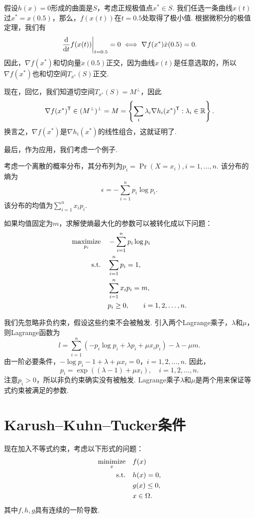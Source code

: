 假设$h(x)=0$形成的曲面是$S$，考虑正规极值点$x^*\in S$. 我们任选一条曲线$x(t)$过$x^*=x(0.5)$，那么，$f(x(t))$在$t=0.5$处取得了极小值. 根据微积分的极值定理，我们有
\[\left.\frac{\mathrm{d}}{\mathrm{d} t}f(x(t))\right|_{t=0.5}=0\iff \nabla f(x^*)\dot{x}(0.5)=0.\]
因此，$\nabla f(x^*)$和切向量$\dot{x}(0.5)$正交，因为曲线$x(t)$是任意选取的，所以$\nabla f(x^*)$也和切空间$T_{x^*}(S)$正交.

现在，回忆，我们知道切空间$T_{x^*}(S)=M^\perp$，因此
\[\nabla f(x^*)^{\mathsf{T}}\in (M^\perp)^\perp=M=\left\{\sum_{i} \lambda_i \nabla h_i(x^*)^{\mathsf{T}}:\lambda_i\in\mathbb{R}\right\}.\]
换言之，$\nabla f(x^*)$是$\nabla h_i(x^*)$的线性组合，这就证明了.


最后，作为应用，我们考虑一个例子.

\begin{example}[最大熵]\label{ex:max-entropy}
考虑一个离散的概率分布，其分布列为$p_i=\Pr(X=x_i),i=1,\dots,n$. 该分布的熵为
$$\epsilon = -\sum_{i=1}^n p_i \log p_i.$$
该分布的均值为$\sum_{i=1}^n x_i p_i$. 

如果均值固定为$m$，求解使熵最大化的参数可以被转化成以下问题：
\begin{align*}
\operatorname*{maximize}_{p_i}\quad&-\sum_{i=1}^n p_i\log p_i \\
\text{s.t.}\quad& \sum_{i=1}^n p_i=1, \\
&\sum_{i=1}^n x_i p_i=m, \\
&p_i\geq 0, \qquad i=1,2,\dots,n.
\end{align*}

我们先忽略非负约束，假设这些约束不会被触发. 引入两个Lagrange乘子，$\lambda$和$\mu$，则Lagrange函数为
$$l=\sum_{i=1}^n (-p_i\log p_i+\lambda p_i+\mu x_ip_i)-\lambda-\mu m.$$
由一阶必要条件，$-\log p_i -1+\lambda+\mu x_i=0$，$i=1,2,\dots,n$. 因此，
$$p_i=\exp((\lambda-1)+\mu x_i),\quad i=1,2,\dots, n.$$
注意$p_i>0$，所以非负约束确实没有被触发. Lagrange乘子$\lambda$和$\mu$是两个用来保证等式约束被满足的参数. 
\end{example}

\section{Karush–Kuhn–Tucker条件}\label{sec:KKT}
现在加入不等式约束，考虑以下形式的问题：
\begin{equation}
\begin{aligned}
\operatorname*{minimize}_x\quad& f(x) \\
\text{s.t.}\quad& h(x)=0, \\
&g(x)\leq 0,\\
& x \in \Omega.
\end{aligned}\label{eq:ineq-constraint-inequality-differentiable}
\end{equation}
其中$f,h,g$具有连续的一阶导数. 

